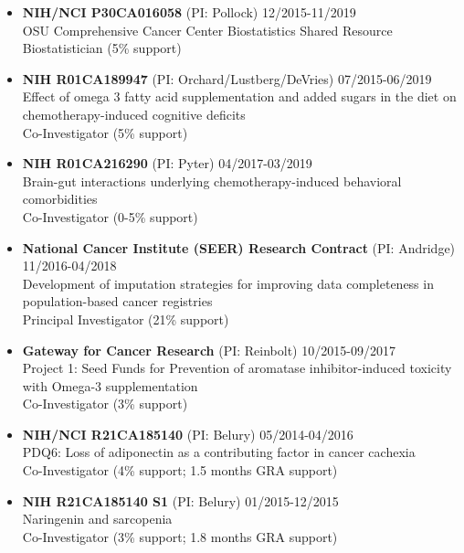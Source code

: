 \documentclass[
  english,
  letterpaper,
  DIV=11,
  numbers=noendperiod]{scrartcl}
\begin{document}
\begin{itemize}
  {04/2017-04/2020}\\
  Ketogenic diet and chemotherapy to affect response to breast cancer
  treatment\\
  Co-Investigator (0-6\% support across years 1-3)
\item
  \textbf{NIH/NCI P30CA016058} (PI: Pollock) {12/2015-11/2019}\\
  OSU Comprehensive Cancer Center Biostatistics Shared Resource\\
  Biostatistician (5\% support)\\
\item
  \textbf{NIH R01CA189947} (PI: Orchard/Lustberg/DeVries)
  {07/2015-06/2019}\\
  Effect of omega 3 fatty acid supplementation and added sugars in the
  diet on chemotherapy-induced cognitive deficits\\
  Co-Investigator (5\% support)\\
\item
  \textbf{NIH R01CA216290} (PI: Pyter) {04/2017-03/2019}\\
  Brain-gut interactions underlying chemotherapy-induced behavioral
  comorbidities\\
  Co-Investigator (0-5\% support)\\
\item
  \textbf{National Cancer Institute (SEER) Research Contract} (PI:
  Andridge) {11/2016-04/2018}\\
  Development of imputation strategies for improving data completeness
  in population-based cancer registries\\
  Principal Investigator (21\% support)
\item
  \textbf{Gateway for Cancer Research} (PI: Reinbolt)
  {10/2015-09/2017}\\
  Project 1: Seed Funds for Prevention of aromatase inhibitor-induced
  toxicity with Omega-3 supplementation\\
  Co-Investigator (3\% support)
\item
  \textbf{NIH/NCI R21CA185140} (PI: Belury) {05/2014-04/2016}\\
  PDQ6: Loss of adiponectin as a contributing factor in cancer
  cachexia\\
  Co-Investigator (4\% support; 1.5 months GRA support)
\item
  \textbf{NIH R21CA185140 S1} (PI: Belury) {01/2015-12/2015}\\
  Naringenin and sarcopenia\\
  Co-Investigator (3\% support; 1.8 months GRA support)

\end{itemize}
\end{document}
